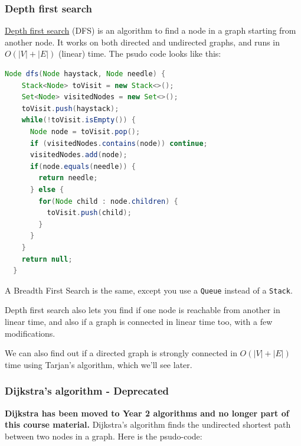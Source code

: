 \subsubsection{Depth first search}
\label{depth-first-search}

\href{https://en.wikipedia.org/wiki/Depth-first_search}{Depth first search}
(DFS) is an algorithm to find a node in a graph starting from another node. It
works on both directed and undirected graphs, and runs in $O(|V| + |E|)$
(linear) time. The psudo code looks like this:


\begin{lstlisting}[language=java]
  Node dfs(Node haystack, Node needle) {
    Stack<Node> toVisit = new Stack<>();
    Set<Node> visitedNodes = new Set<>();
    toVisit.push(haystack);
    while(!toVisit.isEmpty()) {
      Node node = toVisit.pop();
      if (visitedNodes.contains(node)) continue;
      visitedNodes.add(node);
      if(node.equals(needle)) {
        return needle;
      } else {
        for(Node child : node.children) {
          toVisit.push(child);
        }
      }
    }
    return null;
  }
\end{lstlisting}

A Breadth First Search is the same, except you use a \texttt{Queue} instead of a
\texttt{Stack}.


Depth first search also lets you find if one node is reachable from another in
linear time, and also if a graph is connected in linear time too, with a few
modifications.

We can also find out if a directed graph is strongly connected in $O(|V| + |E|)$
time using Tarjan's algorithm, which we'll see later.

\subsubsection{Dijkstra's algorithm - Deprecated}
\textbf{Dijkstra has been moved to Year 2 algorithms and no longer part of this course material.}
Dijkstra's algorithm finds the undirected shortest path between two nodes in a
graph. Here is the psudo-code:


